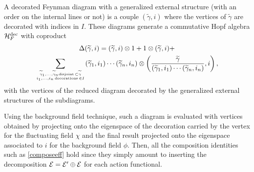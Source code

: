 \documentclass[12pt,here,feynmf]{article}
\begin{document}
A decorated Feynman diagram with a generalized external structure (with an order on the internal lines or not) is a couple $(\widetilde{\gamma},i)$ where the vertices of $\widetilde{\gamma}$ are decorated with indices in $I$. These diagrams generate a commutative Hopf algebra ${\cal H}_{F}^{\mathrm{dec}}$ with coproduct  
\begin{multline}
\Delta(\widetilde{\gamma},i)=(\widetilde{\gamma},i)\otimes 1+1\otimes(\widetilde{\gamma},i)+\\
\mathop{\sum}\limits_{\widetilde{\gamma}_{1},\dots,\widetilde{\gamma}_{n}
{\mathrm{disjoint}\,\subset\widetilde{\gamma}}
\atop
i_{1},\dots,i_{n} \,\mathrm{decorations}\,\in I}
(\widetilde{\gamma}_{1},i_{1})\cdots(\widetilde{\gamma}_{n},i_{n})
\otimes\left(\frac{\widetilde{\gamma}}{(\widetilde{\gamma}_{1},i_{1})\cdots(\widetilde{\gamma}_{n},i_{n})},i\right),
\end{multline}
with the vertices of the reduced diagram decorated by the generalized external structures of the subdiagrams. 

Using the background field technique, such a diagram is evaluated with vertices obtained by projecting onto the eigenspace of the decoration carried by the vertex for the fluctuating field $\chi$ and the final result projected onto the eigenspace associated to $i$ for the background field $\phi$. Then, all the composition identities such as \eqref{composeeff} hold since they simply amount to inserting the decomposition ${\cal E}={\cal E'}\oplus{\cal E}$ for each action functional. 
\end{document}

